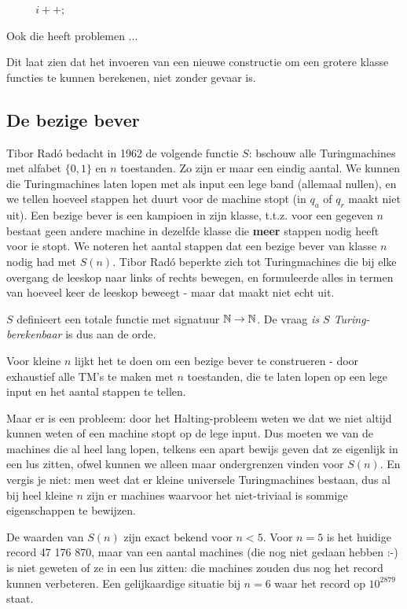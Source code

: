 $~~~~~~~~~~~~i++;$


Ook die heeft problemen ...


Dit laat zien dat het invoeren van een nieuwe constructie om een
grotere klasse functies te kunnen berekenen, niet zonder gevaar is.

\subsection{De bezige bever}

Tibor Rad\'{o} bedacht in 1962 de volgende functie $S$:
bschouw alle Turingmachines met alfabet $\{0,1\}$ en $n$ toestanden.
Zo zijn er maar een eindig aantal. We kunnen die Turingmachines laten
lopen met als input een lege band (allemaal nullen), en we tellen
hoeveel stappen het duurt voor de machine stopt (in $q_a$ of $q_r$
maakt niet uit).  Een bezige bever is een kampioen in zijn klasse,
t.t.z. voor een gegeven $n$ bestaat geen andere machine in dezelfde
klasse die {\bf meer} stappen nodig heeft voor ie stopt. We noteren
het aantal stappen dat een bezige bever van klasse $n$ nodig had met
$S(n)$. Tibor Rad\'{o} beperkte zich tot Turingmachines die bij elke
overgang de leeskop naar links of rechts bewegen, en formuleerde alles
in termen van hoeveel keer de leeskop beweegt - maar dat maakt niet
echt uit.

$S$ definieert een totale functie met signatuur $\mathbb{N} \rightarrow \mathbb{N}$.
De vraag {\em is $S$ Turing-berekenbaar} is dus aan de orde.


Voor kleine $n$ lijkt het te doen om een bezige bever te construeren -
door exhaustief alle TM's te maken met $n$ toestanden, die te laten
lopen op een lege input en het aantal stappen te tellen.


Maar er is een probleem: door het Halting-probleem weten we dat we
niet altijd kunnen weten of een machine stopt op de lege input. Dus
moeten we van de machines die al heel lang lopen, telkens een apart
bewijs geven dat ze eigenlijk in een lus zitten, ofwel kunnen we
alleen maar ondergrenzen vinden voor $S(n)$. En vergis je niet:
men weet dat er kleine universele Turingmachines bestaan, dus al bij
heel kleine $n$ zijn er machines waarvoor het niet-triviaal is sommige
eigenschappen te bewijzen.


De waarden van $S(n)$ zijn exact bekend voor $n < 5$. Voor $n =
5$ is het huidige record 47 176 870, maar van een aantal machines (die nog
niet gedaan hebben :-) is niet geweten of ze in een lus zitten: die
machines zouden dus nog het record kunnen verbeteren. Een
gelijkaardige situatie bij $n = 6$ waar het record op $10^{2879}$
staat.  

